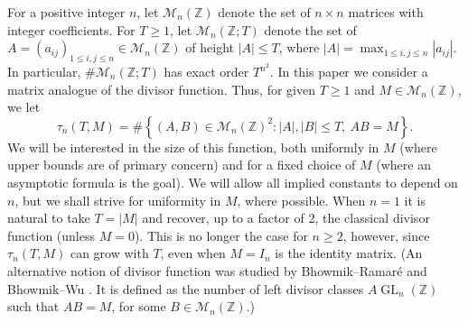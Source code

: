 \documentclass[11pt,reqno]{amsart}
\def\({\left(}
\def\){\right)}
\theoremstyle{definition}
\theoremstyle{remark}
\newcommand{\GL}{\operatorname{GL}}
\numberwithin{equation}{section}
\numberwithin{thm}{section}
\numberwithin{table}{section}
\def\cM{{\mathcal M}}
\def \Z {{\mathbb Z}}
\newcommand{\ZZ}{\mathbb Z}
\begin{document}
For a positive integer $n$, 
let  $\cM_n\(\Z\)$   denote the set of $n\times n$ matrices with integer coefficients. 
For  $T\geq 1$, let $\cM_n\(\Z; T\)$   denote the
set  of 
$A = \(a_{ij}\)_{1\leq i,j\leq n}\in \cM_n(\Z)$ of 
height $|A|\leq T$, where $|A|=\max_{1\leq i,j\leq n}|a_{ij}|$.
In particular,   $\# \cM_n\(\Z; T\)$ has exact order $T^{n^2}$.
In this paper we consider a matrix analogue of the divisor function. Thus, for given $T\geq 1$ and 
$M\in \mathcal{M}_n(\ZZ)$, we let
\begin{equation}\label{eq:divisor}
\tau_n(T,M)=\#\left\{(A,B)\in \mathcal{M}_n(\ZZ)^2: |A|,|B|\leq T, ~AB=M
\right\}.
\end{equation}
We will be interested in the size of this function, both uniformly in $M$ (where upper  bounds are of primary concern) and for a fixed choice of  $M$ (where  an asymptotic formula is the goal).
 We will allow all implied constants to depend on $n$, but we shall strive for uniformity in $M$, where possible.
When $n=1$ it is natural to take $T=|M|$ and recover, up to a factor of 2, the classical divisor function (unless $M=0$).
This is no longer the case for $n\geq2$, however, since 
$\tau_n(T,M)$ can grow with $T$,  even when $M=I_n$ is the identity matrix. 
(An alternative notion of divisor function was studied by Bhowmik--Ramar\'e \cite{BR} and Bhowmik--Wu \cite{bhowmik_wu_zeta2001}. It is  defined as the number of left divisor classes $A \GL_n(\Z)$ such that $AB=M$, for some $B \in \mathcal{M}_n(\Z)$.)
\end{document}
